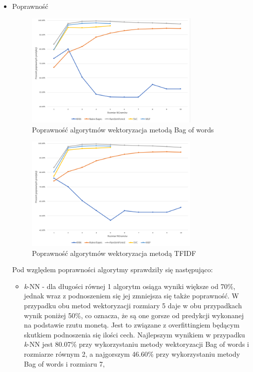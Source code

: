 \begin{itemize}
    \item Poprawność
    \begin{figure}[h!]
        \centering
        \includegraphics[width=0.8\textwidth]{./Img/BOWAcc.png}
        \caption{Poprawność algorytmów wektoryzacja metodą Bag of words}
    \end{figure}
    
    \begin{figure}[h!]
        \centering
        \includegraphics[width=0.8\textwidth]{./Img/TFIDFAcc.png}
        \caption{Poprawność algorytmów wektoryzacja metodą TFIDF}
    \end{figure}
    
    Pod względem poprawności algorytmy sprawdziły się następująco:
    \begin{itemize}
        \item \textit{k}-NN -
        dla długości równej 1 algorytm osiąga wyniki większe od 70\%, jednak wraz 
        z podnoszeniem się jej zmniejsza się także poprawność. W przypadku obu metod 
        wektoryzacji rozmiary 5 daje w obu przypadkach wynik poniżej 50\%, co oznacza, że są one gorsze 
        od predykcji wykonanej na podstawie rzutu monetą. Jest to związane 
        z overfittingiem będącym skutkiem podnoszenia się ilości cech. Najlepszym wynikiem w 
        przypadku \textit{k}-NN jest 80.07\% przy wykorzystaniu metody wektoryzacji Bag of words i rozmiarze równym 2,
        a najgorszym 46.60\%  przy wykorzystaniu metody Bag of words i rozmiaru 7,


\end{itemize}
\end{itemize}
